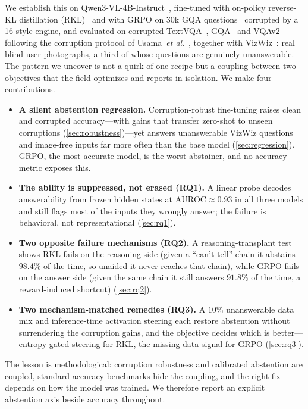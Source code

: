 \documentclass[10pt,twocolumn,letterpaper]{article}
\makeatletter
\providecommand{\etal}{\textit{et al}.\@\xspace}
\makeatother
\begin{document}
We establish this on Qwen3-VL-4B-Instruct~\cite{qwen3vl2025}, fine-tuned with on-policy
reverse-KL distillation (RKL)~\cite{gu2024minillm} and with GRPO on 30k GQA
questions~\cite{hudson2019gqa} corrupted by a 16-style engine, and evaluated on
corrupted TextVQA~\cite{singh2019textvqa}, GQA~\cite{hudson2019gqa} and
VQAv2~\cite{goyal2017vqav2} following the corruption protocol of
Usama~\etal~\cite{usama2025analysing}, together with VizWiz~\cite{gurari2018vizwiz}: real
blind-user photographs, a third of whose questions are genuinely unanswerable. The
pattern we uncover is not a quirk of one recipe but a coupling between two objectives
that the field optimizes and reports in isolation. We make four contributions.

\begin{itemize}
\item \textbf{A silent abstention regression.} Corruption-robust fine-tuning raises
clean and corrupted accuracy---with gains that transfer zero-shot to unseen
corruptions (\cref{sec:robustness})---yet answers unanswerable VizWiz questions and
image-free inputs far more often than the base model (\cref{sec:regression}). GRPO,
the most accurate model, is the worst abstainer, and no accuracy metric exposes this.

\item \textbf{The ability is suppressed, not erased (RQ1).} A linear probe decodes
answerability from frozen hidden states at $\text{AUROC}\approx0.93$ in all three models
and still flags most of the inputs they wrongly answer; the failure is behavioral, not
representational (\cref{sec:rq1}).

\item \textbf{Two opposite failure mechanisms (RQ2).} A reasoning-transplant test shows
RKL fails on the reasoning side (given a ``can't-tell'' chain it abstains $98.4\%$ of
the time, so unaided it never reaches that chain), while GRPO fails on the answer side
(given the same chain it still answers $91.8\%$ of the time, a reward-induced shortcut)
(\cref{sec:rq2}).

\item \textbf{Two mechanism-matched remedies (RQ3).} A $10\%$ unanswerable data mix and
inference-time activation steering each restore abstention without surrendering the
corruption gains, and the objective decides which is better---entropy-gated steering
for RKL, the missing data signal for GRPO (\cref{sec:rq3}).
\end{itemize}

The lesson is methodological: corruption robustness and calibrated abstention are
coupled, standard accuracy benchmarks hide the coupling, and the right fix depends on
how the model was trained. We therefore report an explicit abstention axis beside
accuracy throughout.
\end{document}
